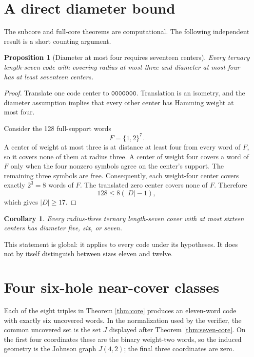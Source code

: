 \documentclass[11pt]{article}
\newtheorem{corollary}[theorem]{Corollary}
\newtheorem{proposition}[theorem]{Proposition}
\newcommand{\codeword}[1]{\texttt{#1}}
\begin{document}
\section{A direct diameter bound}

The subcore and full-core theorems are computational.  The following
independent result is a short counting argument.

\begin{proposition}[Diameter at most four requires seventeen centers]
\label{prop:diameter}
Every ternary length-seven code with covering radius at most three and
diameter at most four has at least seventeen centers.
\end{proposition}

\begin{proof}
Translate one code center to \(\codeword{0000000}\).  Translation is an
isometry, and the diameter assumption implies that every other center
has Hamming weight at most four.

Consider the 128 full-support words
\[
  F=\{1,2\}^7.
\]
A center of weight at most three is at distance at least four from every
word of \(F\), so it covers none of them at radius three.  A center of
weight four covers a word of \(F\) only when the four nonzero symbols
agree on the center's support.  The remaining three symbols are free.
Consequently, each weight-four center covers exactly \(2^3=8\) words of
\(F\).  The translated zero center covers none of \(F\).  Therefore
\[
  128\leq 8(|D|-1),
\]
which gives \(|D|\geq 17\).
\end{proof}

\begin{corollary}
Every radius-three ternary length-seven cover with at most sixteen
centers has diameter five, six, or seven.
\end{corollary}

This statement is global: it applies to every code under its hypotheses.
It does not by itself distinguish between sizes eleven and twelve.

\section{Four six-hole near-cover classes}

Each of the eight triples in Theorem \ref{thm:core} produces an
eleven-word code with exactly six uncovered words.  In the normalization
used by the verifier, the common uncovered set is the set \(J\) displayed
after Theorem \ref{thm:seven-core}.
On the first four coordinates these are the binary weight-two words, so
the induced geometry is the Johnson graph \(J(4,2)\); the final three
coordinates are zero.
\end{document}
